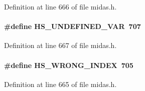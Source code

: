\begin{DoxyItemize}
\item 
\end{DoxyItemize}

Definition at line 666 of file midas.h.
\paragraph[{HS\_\-UNDEFINED\_\-VAR}]{\setlength{\rightskip}{0pt plus 5cm}\#define HS\_\-UNDEFINED\_\-VAR~707}\hfill\label{group__err26_ga1b25c77e3145468cf83f8e88bf1e0804}

\begin{DoxyItemize}
\item 
\end{DoxyItemize}

Definition at line 667 of file midas.h.
\paragraph[{HS\_\-WRONG\_\-INDEX}]{\setlength{\rightskip}{0pt plus 5cm}\#define HS\_\-WRONG\_\-INDEX~705}\hfill\label{group__err26_gab8c5289d12d853f0d8266cdf37c39b08}

\begin{DoxyItemize}
\item 
\end{DoxyItemize}

Definition at line 665 of file midas.h.